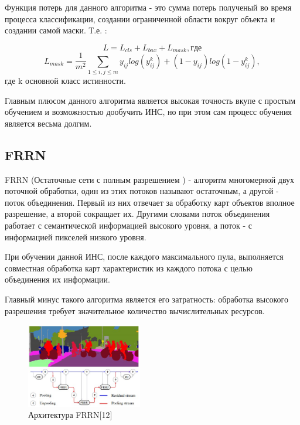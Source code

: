 \documentclass[bachelor, och, coursework]{shiza}
\begin{document}
Функция потерь для данного алгоритма - это сумма потерь полученый во время процесса классификации, создании ограниченной области вокруг объекта и создании самой маски. Т.е. :

\begin{equation}
    L = L_{cls} + L_{box} + L_{mask}, где
\end{equation}
\begin{equation}
    L_{mask} = \frac{1}{m^2}\sum\limits_{1 \leq i, j \leq m}y_{ij}log(y_{ij}^k) + (1 - y_{ij})log(1 - y_{ij}^k),
\end{equation}
где k основной класс истинности.

Главным плюсом данного алгоритма является высокая точность вкупе с простым обучением и возможностью дообучить ИНС, но при этом сам процесс обучения
является весьма долгим.

\subsection{FRRN}

FRRN (Остаточные сети с полным разрешением ) - алгоритм многомерной двух поточной обработки, один из этих потоков называют остаточным, а другой - поток 
объединения. Первый из них отвечает за обработку карт объектов вполное разрешение, а второй сокращает их. Другими словами поток объединения работает с 
семантической информацией высокого уровня, а поток - с информацией пикселей низкого уровня.

При обучении данной ИНС, после каждого максимального пула, выполняется совместная обработка карт характеристик из каждого потока с целью объединения их информации.

Главный минус такого алгоритма является его затратность: обработка высокого разрешения требует значительное количество вычислительных ресурсов.

\begin{figure}[H]
    \centering
    \includegraphics[width=0.45\textwidth]{11}
    \caption{Архитектура FRRN[12]}
    \label{fig:img1}
\end{figure}
\end{document}
